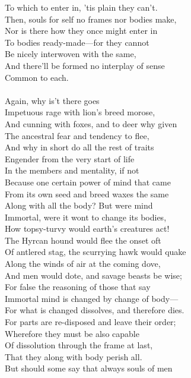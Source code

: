 To which to enter in, 'tis plain they can't.\\
Then, souls for self no frames nor bodies make,\\
Nor is there how they once might enter in\\
To bodies ready-made—for they cannot\\
Be nicely interwoven with the same,\\
And there'll be formed no interplay of sense\\
Common to each.\\
\\
Again, why is't there goes\\
Impetuous rage with lion's breed morose,\\
And cunning with foxes, and to deer why given\\
The ancestral fear and tendency to flee,\\
And why in short do all the rest of traits\\
Engender from the very start of life\\
In the members and mentality, if not\\
Because one certain power of mind that came\\
From its own seed and breed waxes the same\\
Along with all the body? But were mind\\
Immortal, were it wont to change its bodies,\\
How topsy-turvy would earth's creatures act!\\
The Hyrcan hound would flee the onset oft\\
Of antlered stag, the scurrying hawk would quake\\
Along the winds of air at the coming dove,\\
And men would dote, and savage beasts be wise;\\
For false the reasoning of those that say\\
Immortal mind is changed by change of body—\\
For what is changed dissolves, and therefore dies.\\
For parts are re-disposed and leave their order;\\
Wherefore they must be also capable\\
Of dissolution through the frame at last,\\
That they along with body perish all.\\
But should some say that always souls of men\\
